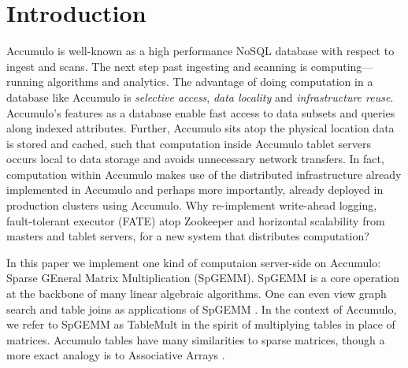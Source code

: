 
\section{Introduction}
\label{sIntro}

Accumulo is well-known as a high performance NoSQL database with respect to ingest and scans.
The next step past ingesting and scanning is computing---running algorithms and analytics.
The advantage of doing computation in a database like Accumulo %
is \emph{selective access}, \emph{data locality} and \emph{infrastructure reuse}.
Accumulo's features as a database enable fast access to data subsets and queries along indexed attributes.
Further, Accumulo sits atop the physical location data is stored and cached, such that computation inside
Accumulo tablet servers occurs local to data storage and avoids unnecessary network transfers.
In fact, computation within Accumulo makes use of the distributed infrastructure already implemented 
in Accumulo and perhaps more importantly, already deployed in production clusters using Accumulo.
Why re-implement write-ahead logging, fault-tolerant executor (FATE) atop Zookeeper and 
horizontal scalability from masters and tablet servers, for a new system that distributes computation?


In this paper we implement one kind of computaion server-side on Accumulo: 
Sparse GEneral Matrix Multiplication (SpGEMM).
SpGEMM is a core operation at the backbone of many linear algebraic algorithms.
One can even view graph search \cite{kepner2011graph} and table joins as applications of SpGEMM \cite{x}.
In the context of Accumulo, we refer to SpGEMM as TableMult in the spirit of multiplying tables in place of matrices.
Accumulo tables have many similarities to sparse matrices, though a more exact analogy is to Associative Arrays 
\cite{kepner2014gabb}.



